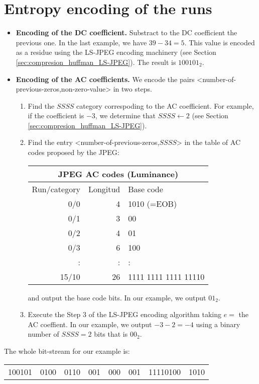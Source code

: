 \section{Entropy encoding of the runs}
\begin{itemize}
\item \textbf{Encoding of the DC coefficient.} Substract to the DC
  coefficient the previous one. In the last example, we have
  $39-34=5$. This value is encoded as a residue using the LS-JPEG
  encoding machinery (see Section
  \ref{sec:compresion_huffman_LS-JPEG}). The result is $100101_2$.
\item \textbf{Encoding of the AC coefficients.} We encode the pairs
  <number-of-previous-zeros,non-zero-value> in two steps.
  \begin{enumerate}
  \item Find the $SSSS$ category correspoding to the AC coefficient. For
    example, if the coefficient is $-3$, we determine that
    $SSSS\leftarrow 2$ (see Section
    \ref{sec:compresion_huffman_LS-JPEG}).
  \item Find the entry <number-of-previous-zeros,$SSSS$> in the table of
    AC codes proposed by the JPEG:
    \begin{center}
      \begin{tabular}{|r|r|l|}
        \multicolumn{3}{c}{JPEG AC codes (Luminance)}\\
        \hline
        Run/category & Longitud & Base code \\
        \hline
        0/0 & 4 & 1010 (=EOB) \\
        0/1 & 3 & 00 \\
        0/2 & 4 & 01 \\
        0/3 & 6 & 100 \\
        : & : & :\\
        15/10 & 26 & 1111 1111 1111 11110 \\
        \hline
      \end{tabular}
    \end{center}
    and output the base code bits. In our example, we output $01_2$.
  \item Execute the Step 3 of the LS-JPEG encoding algorithm taking $e=$
    the AC coeffient. In our example, we output $-3-2=-4$ using a binary
    number of $SSSS=2$ bits that is $00_2$.
  \end{enumerate}
\end{itemize}

The whole bit-stream for our example is:
\begin{center}
  \begin{tabular}{cccccccc}
    100101 & 0100 & 0110 & 001 & 000 & 001 & 11110100 & 1010
  \end{tabular}
\end{center}


